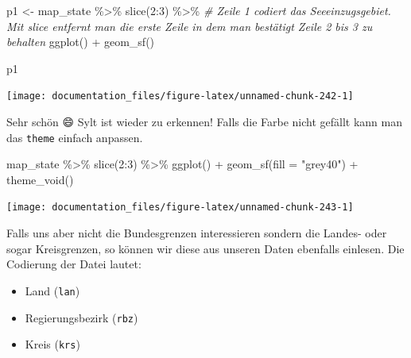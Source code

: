 \documentclass[
]{article}
\newenvironment{Shaded}{\begin{snugshade}}{\end{snugshade}}
\newcommand{\AttributeTok}[1]{\textcolor[rgb]{0.77,0.63,0.00}{#1}}
\newcommand{\CommentTok}[1]{\textcolor[rgb]{0.56,0.35,0.01}{\textit{#1}}}
\newcommand{\DecValTok}[1]{\textcolor[rgb]{0.00,0.00,0.81}{#1}}
\newcommand{\FunctionTok}[1]{\textcolor[rgb]{0.00,0.00,0.00}{#1}}
\newcommand{\NormalTok}[1]{#1}
\newcommand{\OtherTok}[1]{\textcolor[rgb]{0.56,0.35,0.01}{#1}}
\newcommand{\SpecialCharTok}[1]{\textcolor[rgb]{0.00,0.00,0.00}{#1}}
\newcommand{\StringTok}[1]{\textcolor[rgb]{0.31,0.60,0.02}{#1}}
\providecommand{\tightlist}{%
  \setlength{\itemsep}{0pt}\setlength{\parskip}{0pt}}
\begin{document}
\begin{Shaded}
\begin{Highlighting}[]

\NormalTok{p1 }\OtherTok{\textless{}{-}}\NormalTok{ map\_state }\SpecialCharTok{\%\textgreater{}\%}
  \FunctionTok{slice}\NormalTok{(}\DecValTok{2}\SpecialCharTok{:}\DecValTok{3}\NormalTok{) }\SpecialCharTok{\%\textgreater{}\%}  \CommentTok{\# Zeile 1 codiert das Seeeinzugsgebiet. Mit \textasciigrave{}slice\textasciigrave{} entfernt man die erste Zeile in dem man bestätigt Zeile 2 bis 3 zu behalten}
  \FunctionTok{ggplot}\NormalTok{() }\SpecialCharTok{+}
  \FunctionTok{geom\_sf}\NormalTok{()}

\NormalTok{p1}
\end{Highlighting}
\end{Shaded}

\begin{center}\texttt{[image: documentation\_files/figure-latex/unnamed-chunk-242-1]} \end{center}

Sehr schön 😄 Sylt ist wieder zu erkennen! Falls die Farbe nicht gefällt kann man das \texttt{theme} einfach anpassen.

\begin{Shaded}
\begin{Highlighting}[]

\NormalTok{map\_state }\SpecialCharTok{\%\textgreater{}\%}
  \FunctionTok{slice}\NormalTok{(}\DecValTok{2}\SpecialCharTok{:}\DecValTok{3}\NormalTok{) }\SpecialCharTok{\%\textgreater{}\%}
  \FunctionTok{ggplot}\NormalTok{() }\SpecialCharTok{+}
  \FunctionTok{geom\_sf}\NormalTok{(}\AttributeTok{fill =} \StringTok{"grey40"}\NormalTok{) }\SpecialCharTok{+}
  \FunctionTok{theme\_void}\NormalTok{()}
\end{Highlighting}
\end{Shaded}

\begin{center}\texttt{[image: documentation\_files/figure-latex/unnamed-chunk-243-1]} \end{center}

Falls uns aber nicht die Bundesgrenzen interessieren sondern die Landes- oder sogar Kreisgrenzen, so können wir diese aus unseren Daten ebenfalls einlesen. Die Codierung der Datei lautet:

\begin{itemize}
\tightlist
\item
  Land (\texttt{lan})
\item
  Regierungsbezirk (\texttt{rbz})
\item
  Kreis (\texttt{krs})
\end{itemize}
\end{document}
